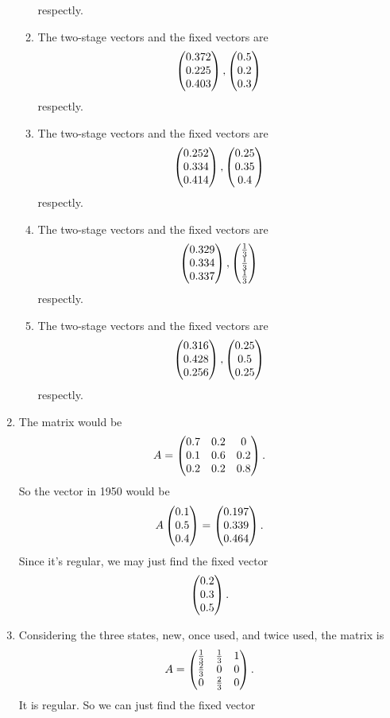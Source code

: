 \begin{enumerate}
\begin{enumerate}
respectly.
\item The two-stage vectors and the fixed vectors are
\[\begin{pmatrix}0.372\cr 0.225\cr 0.403\end{pmatrix},\begin{pmatrix}0.5\cr 0.2\cr 0.3\end{pmatrix}\]
respectly.
\item The two-stage vectors and the fixed vectors are
\[\begin{pmatrix}0.252\cr 0.334\cr 0.414\end{pmatrix},\begin{pmatrix}0.25\cr 0.35\cr 0.4\end{pmatrix}\]
respectly.
\item The two-stage vectors and the fixed vectors are
\[\begin{pmatrix}0.329\cr 0.334\cr 0.337\end{pmatrix},\begin{pmatrix}\frac{1}{3}\cr \frac{1}{3}\cr \frac{1}{3}\end{pmatrix}\]
respectly.
\item The two-stage vectors and the fixed vectors are
\[\begin{pmatrix}0.316\cr 0.428\cr 0.256\end{pmatrix},\begin{pmatrix}0.25\cr 0.5\cr 0.25\end{pmatrix}\]
respectly.
\end{enumerate}
\item The matrix would be 
\[A=\begin{pmatrix}0.7 & 0.2 & 0\cr 0.1 & 0.6 & 0.2\cr 0.2 & 0.2 & 0.8\end{pmatrix}.\]
So the vector in 1950 would be 
\[A\begin{pmatrix}0.1\cr 0.5\cr 0.4\end{pmatrix}=\begin{pmatrix}0.197\cr 0.339\cr 0.464\end{pmatrix}.\]
Since it's regular, we may just find the fixed vector 
\[\begin{pmatrix}0.2\cr 0.3\cr 0.5\end{pmatrix}.\]
\item Considering the three states, new, once used, and twice used, the matrix is 
\[A=\begin{pmatrix}\frac{1}{3} & \frac{1}{3} & 1\cr \frac{2}{3} & 0 & 0\cr 0 & \frac{2}{3} & 0\end{pmatrix}.\]
It is regular. So we can just find the fixed vector

\end{enumerate}
